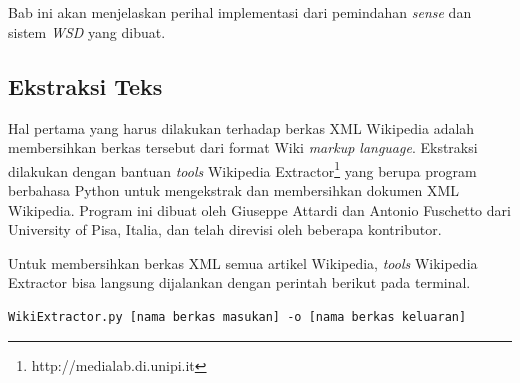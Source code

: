 \chapter{\babEmpat} \label{implementasi}
Bab ini akan menjelaskan perihal implementasi dari pemindahan \textit{sense} dan sistem \textit{WSD} yang dibuat.

\section{Ekstraksi Teks}
Hal pertama yang harus dilakukan terhadap berkas XML Wikipedia adalah membersihkan berkas tersebut dari format Wiki \textit{markup language}. Ekstraksi dilakukan dengan bantuan \textit{tools} Wikipedia Extractor\footnote{http://medialab.di.unipi.it} yang berupa program berbahasa Python untuk mengekstrak dan membersihkan dokumen XML Wikipedia. Program ini dibuat oleh Giuseppe Attardi dan Antonio Fuschetto dari University of Pisa, Italia, dan telah direvisi oleh beberapa kontributor. 

Untuk membersihkan berkas XML semua artikel Wikipedia, \textit{tools} Wikipedia Extractor bisa langsung dijalankan dengan perintah berikut pada terminal.

\begin{lstlisting}
WikiExtractor.py [nama berkas masukan] -o [nama berkas keluaran]
\end{lstlisting}

